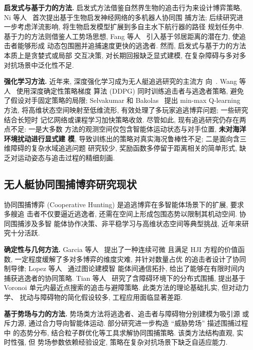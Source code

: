 \textbf{启发式与基于力的方法.} 启发式方法借鉴自然界生物的追击行为来设计博弈策略,
Ni 等人~\cite{ni2011bioinspired} 首次提出基于生物启发神经网络的多机器人协同围
捕方法; 后续研究进一步考虑洋流影响, 将生物启发模型扩展到多自主水下航行器的路径
规划任务中. 基于力的方法则借鉴人工势场思想,
Fang 等人~\cite{fang2022cooperative} 引入基于邻居距离的潜在力, 使追击者能够形成
动态包围圈并追捕速度更快的逃逸者. 然而, 启发式与基于力的方法本质上是贪婪式或局部
交互决策, 对长期回报缺乏显式建模, 在复杂障碍与多对多对抗场景中泛化性不足.

\textbf{强化学习方法.} 近年来, 深度强化学习成为无人艇追逃研究的主流方
向~\cite{drl_2018}. Wang 等人~\cite{wangy2020cooperative} 使用深度确定性策略梯度
算法 (DDPG) 同时训练追击者与逃逸者策略, 避免了假设对手固定策略的局限;
Selvakumar 和 Bakolas~\cite{selvakumar2022minmax} 提出 min-max Q-learning 方法,
将高维状态空间映射至低维流形, 有效处理了多玩家追逃博弈问题; 一些研究结合长短时
记忆网络或课程学习加快策略收敛. 尽管如此, 现有追逃研究仍存在两点不足: 一是大多数
方法的观测空间仅包含智能体运动状态与对手位置, \textbf{未对海洋环境扰动进行显式建
模}, 导致训练出的策略对真实海况鲁棒性不足; 二是面向含三维障碍的复杂水域追逃问题
研究较少, 奖励函数多停留于距离相关的简单形式, 缺乏对运动姿态与追击过程的精细刻画.

\subsection{无人艇协同围捕博弈研究现状}
\label{subsec:hunt_review}
协同围捕博弈 (Cooperative Hunting) 是追逃博弈在多智能体场景下的扩展, 要求多艘追
击者不仅要逼近逃逸者, 还需在空间上形成包围态势以限制其机动空间. 协同围捕涉及多智
能体协作决策、非平稳学习与高维状态空间等典型挑战, 近年来研究十分活跃.

\textbf{确定性与几何方法.} Garcia 等人~\cite{garcia2020multi} 提出了一种连续可微
且满足 HJI 方程的价值函数, 一定程度缓解了多对多博弈的维度灾难, 并针对数量占优
的追击者设计了协同制导律; Lopez 等人~\cite{lopez2019multiagent} 通过图论建模智
能体间通信拓扑, 给出了能够在有限时间内捕获逃逸者的协同策略.
Tian 等人~\cite{tian2021distributed} 研究了含障碍环境下的分布式围捕, 提出基于
Voronoi 单元内最近点搜索的追击与避障策略. 此类方法的理论基础扎实, 但对动力学、
扰动与障碍物的简化假设较多, 工程应用面临显著差距.

\textbf{基于势场与力的方法.} 势场类方法将逃逸者、追击者与障碍物分别建模为吸引源
或斥力源, 通过合力导向智能体运动. 部分研究进一步构造 ``威胁势场'' 描述围捕过程中
的态势分布, 结合粒子群优化等工具求解协同围捕策略. 该类方法结构直观, 实时性强, 但
势场参数依赖经验设定, 策略在复杂对抗场景下缺乏自适应能力.

